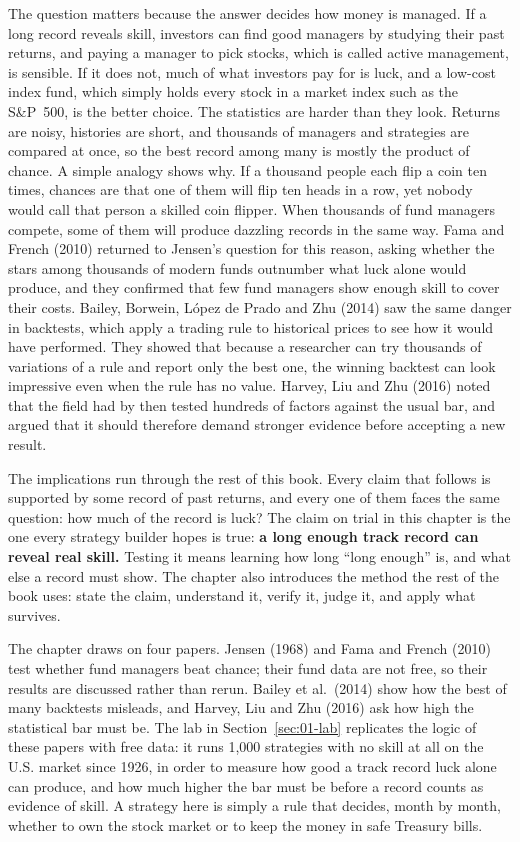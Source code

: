 The question matters because the answer decides how money is managed. If a long record reveals skill, investors can find good managers by studying their past returns, and paying a manager to pick stocks, which is called active management, is sensible. If it does not, much of what investors pay for is luck, and a low-cost index fund, which simply holds every stock in a market index such as the S\&P~500, is the better choice. The statistics are harder than they look. Returns are noisy, histories are short, and thousands of managers and strategies are compared at once, so the best record among many is mostly the product of chance. A simple analogy shows why. If a thousand people each flip a coin ten times, chances are that one of them will flip ten heads in a row, yet nobody would call that person a skilled coin flipper. When thousands of fund managers compete, some of them will produce dazzling records in the same way. Fama and French (2010) returned to Jensen's question for this reason, asking whether the stars among thousands of modern funds outnumber what luck alone would produce, and they confirmed that few fund managers show enough skill to cover their costs. Bailey, Borwein, L\'opez de Prado and Zhu (2014) saw the same danger in backtests, which apply a trading rule to historical prices to see how it would have performed. They showed that because a researcher can try thousands of variations of a rule and report only the best one, the winning backtest can look impressive even when the rule has no value. Harvey, Liu and Zhu (2016) noted that the field had by then tested hundreds of factors against the usual bar, and argued that it should therefore demand stronger evidence before accepting a new result.

The implications run through the rest of this book. Every claim that follows is supported by some record of past returns, and every one of them faces the same question: how much of the record is luck? The claim on trial in this chapter is the one every strategy builder hopes is true: \textbf{a long enough track record can reveal real skill.} Testing it means learning how long ``long enough'' is, and what else a record must show. The chapter also introduces the method the rest of the book uses: state the claim, understand it, verify it, judge it, and apply what survives.

The chapter draws on four papers. Jensen (1968) and Fama and French (2010) test whether fund managers beat chance; their fund data are not free, so their results are discussed rather than rerun. Bailey et al.\ (2014) show how the best of many backtests misleads, and Harvey, Liu and Zhu (2016) ask how high the statistical bar must be. The lab in Section~\ref{sec:01-lab} replicates the logic of these papers with free data: it runs 1,000 strategies with no skill at all on the U.S. market since 1926, in order to measure how good a track record luck alone can produce, and how much higher the bar must be before a record counts as evidence of skill. A strategy here is simply a rule that decides, month by month, whether to own the stock market or to keep the money in safe Treasury bills.

